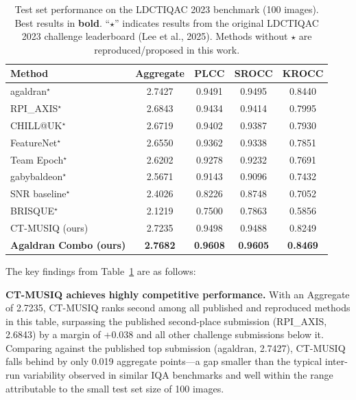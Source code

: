 \begin{table}[h]
    \centering
    \caption{Test set performance on the LDCTIQAC 2023 benchmark (100 images).
             Best results in \textbf{bold}. ``$\star$'' indicates results from the
             original LDCTIQAC 2023 challenge leaderboard (Lee et al., 2025).
             Methods without $\star$ are reproduced/proposed in this work.}
    \label{tab:main_results}
    \begin{tabular}{lcccc}
        \toprule
        \textbf{Method} & \textbf{Aggregate} & \textbf{PLCC} & \textbf{SROCC} & \textbf{KROCC} \\
        \midrule
        agaldran$^\star$   & 2.7427 & 0.9491 & 0.9495 & 0.8440 \\
        RPI\_AXIS$^\star$  & 2.6843 & 0.9434 & 0.9414 & 0.7995 \\
        CHILL@UK$^\star$   & 2.6719 & 0.9402 & 0.9387 & 0.7930 \\
        FeatureNet$^\star$ & 2.6550 & 0.9362 & 0.9338 & 0.7851 \\
        Team Epoch$^\star$ & 2.6202 & 0.9278 & 0.9232 & 0.7691 \\
        gabybaldeon$^\star$ & 2.5671 & 0.9143 & 0.9096 & 0.7432 \\
        SNR baseline$^\star$ & 2.4026 & 0.8226 & 0.8748 & 0.7052 \\
        BRISQUE$^\star$    & 2.1219 & 0.7500 & 0.7863 & 0.5856 \\
        \midrule
        CT-MUSIQ (ours)  & 2.7235 & 0.9498 & 0.9488 & 0.8249 \\
        \textbf{Agaldran Combo (ours)} & \textbf{2.7682} & \textbf{0.9608} & \textbf{0.9605} & \textbf{0.8469} \\
        \bottomrule
    \end{tabular}
\end{table}

The key findings from Table~\ref{tab:main_results} are as follows:

\textbf{CT-MUSIQ achieves highly competitive performance.} With an Aggregate of 2.7235,
CT-MUSIQ ranks second among all published and reproduced methods in this table, surpassing
the published second-place submission (RPI\_AXIS, 2.6843) by a margin of +0.038 and all
other challenge submissions below it. Comparing against the published top submission
(agaldran, 2.7427), CT-MUSIQ falls behind by only 0.019 aggregate points---a gap smaller
than the typical inter-run variability observed in similar IQA benchmarks and well within
the range attributable to the small test set size of 100 images.

